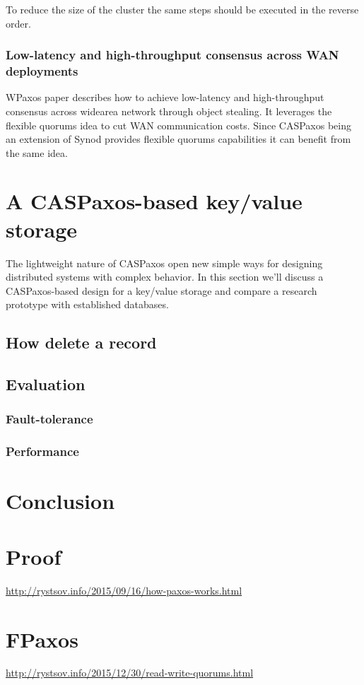 \documentclass[12pt]{article}
\begin{document}
To reduce the size of the cluster the same steps should be executed in the reverse order.

\subsubsection{Low-latency and high-throughput consensus across WAN deployments}

WPaxos\cite{wpaxos} paper describes how to achieve low-latency and high-throughput consensus across widearea network through object stealing. It leverages the flexible quorums\cite{fpaxos} idea to cut WAN communication costs. Since CASPaxos being an extension of Synod provides flexible quorums capabilities it can benefit from the same idea.

\section{A CASPaxos-based key/value storage}

The lightweight nature of CASPaxos open new simple ways for designing distributed systems with complex behavior. In this section we'll discuss a CASPaxos-based design for a key/value storage and compare a research prototype with established databases.

\subsection{How delete a record}
\subsection{Evaluation}
\subsubsection{Fault-tolerance}
\subsubsection{Performance}

\section{Conclusion}

\begin{appendices}
\section{Proof}
\href{http://rystsov.info/2015/09/16/how-paxos-works.html}{http://rystsov.info/2015/09/16/how-paxos-works.html}

\section{FPaxos}
\label{appendix:fpaxos}
\href{http://rystsov.info/2015/12/30/read-write-quorums.html}{http://rystsov.info/2015/12/30/read-write-quorums.html}

\end{appendices}
\end{document}
